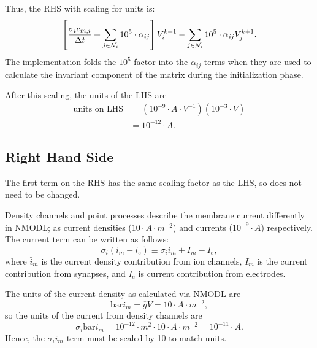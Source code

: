 Thus, the RHS with scaling for units is:
\begin{equation}
    \label{eq:linsys_LHS_scaled}
    \left[
        \frac{\sigma_i c_{m,i}}{\Delta t} + \sum_{j\in\mathcal{N}_i} {10^5\cdot\alpha_{ij}}
    \right]
    V_i^{k+1} - \sum_{j\in\mathcal{N}_i} { 10^5\cdot\alpha_{ij} V_j^{k+1}}.
\end{equation}
The implementation folds the $10^5$ factor into the $\alpha_{ij}$ terms when they are used to calculate the invariant component of the matrix during the initialization phase.

After this scaling, the units of the LHS are
\begin{align}
    \text{units on LHS}
        &= (10^{-9} \cdot A \cdot V^{-1})( 10^{-3} \cdot V) \nonumber \\
        &= 10^{-12} \cdot A. \label{eq:balanced_units}
\end{align}

\subsection{Right Hand Side}
The first term on the RHS has the same scaling factor as the LHS, so does not need to be changed.

Density channels and point processes describe the membrane current differently in NMODL;
as current densities ($10\cdot A\cdot m^{-2}$) and currents ($10^{-9}\cdot A$) respectively.
The current term can be written as follows:
\begin{equation}
    \sigma_i (i_m - i_e) \equiv \sigma_i \bar{i}_m + I_m - I_e,
\end{equation}
where $\bar{i}_m$ is the current density contribution from ion channels, $I_m$ is the current contribution from synapses, and $I_e$ is current contribution from electrodes.

The units of the current density as calculated via NMODL are
\begin{equation}
    \label{eq:im_unit}
    \unit{ \bar{i}_m } =  \unit{ \overline{g} } \unit{ V }
                       =  10 \cdot A \cdot m^{-2},
\end{equation}
so the units of the current from density channels are
\begin{equation}
    \unit{\sigma_i \bar{i}_m} = 10^{-12}\cdot{m}^2 \cdot 10 \cdot A \cdot m^{-2} = 10^{-11}\cdot A.
\end{equation}
Hence, the $\sigma_i \bar{i}_m$ term must be scaled by 10 to match units.

